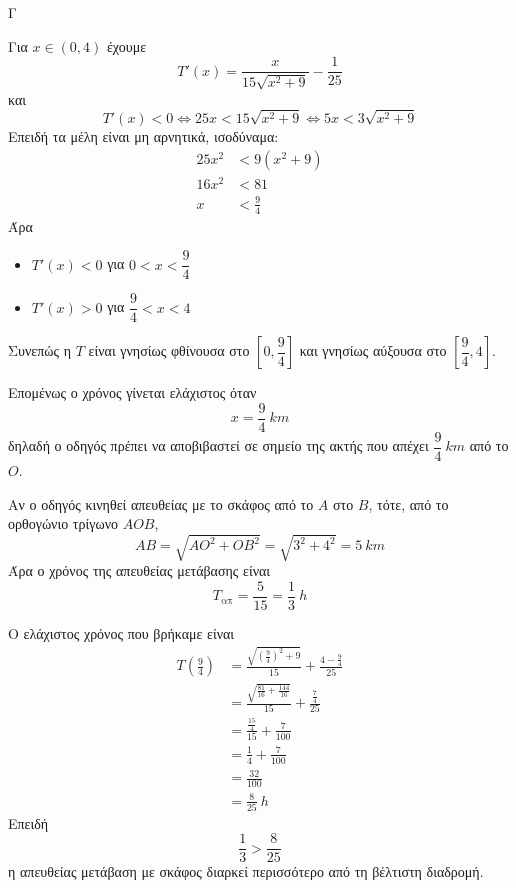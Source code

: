 \begin{thema}{Γ}
\begin{erwthma}
\item Για $x\in(0,4)$ έχουμε
\[T'(x)=\frac{x}{15\sqrt{x^2+9}}-\frac{1}{25}\]
και
\[T'(x)<0 \Leftrightarrow 25x<15\sqrt{x^2+9}\Leftrightarrow 5x<3\sqrt{x^2+9}\]
Επειδή τα μέλη είναι μη αρνητικά, ισοδύναμα:
\begin{align*}
25x^2&<9(x^2+9)\\
16x^2&<81\\
x&<\frac{9}{4}
\end{align*}
Άρα
\begin{itemize}
\item $T'(x)<0$ για $0<x<\dfrac{9}{4}$
\item $T'(x)>0$ για $\dfrac{9}{4}<x<4$
\end{itemize}
Συνεπώς η $T$ είναι γνησίως φθίνουσα στο $\left[0,\dfrac{9}{4}\right]$ και γνησίως αύξουσα στο $\left[\dfrac{9}{4},4\right]$.

Επομένως ο χρόνος γίνεται ελάχιστος όταν
\[x=\frac{9}{4}\ \si{km}\]
δηλαδή ο οδηγός πρέπει να αποβιβαστεί σε σημείο της ακτής που απέχει $\dfrac{9}{4}\ \si{km}$ από το $O$.

\item Αν ο οδηγός κινηθεί απευθείας με το σκάφος από το $A$ στο $B$, τότε, από το ορθογώνιο τρίγωνο $AOB$,
\[AB=\sqrt{AO^2+OB^2}=\sqrt{3^2+4^2}=5\ \si{km}\]
Άρα ο χρόνος της απευθείας μετάβασης είναι
\[T_{\text{απ}}=\frac{5}{15}=\frac{1}{3}\ \si{h}\]

Ο ελάχιστος χρόνος που βρήκαμε είναι
\begin{align*}
T\left(\frac{9}{4}\right)
&=\frac{\sqrt{\left(\frac{9}{4}\right)^2+9}}{15}+\frac{4-\frac{9}{4}}{25}\\
&=\frac{\sqrt{\frac{81}{16}+\frac{144}{16}}}{15}+\frac{\frac{7}{4}}{25}\\
&=\frac{\frac{15}{4}}{15}+\frac{7}{100}\\
&=\frac{1}{4}+\frac{7}{100}\\
&=\frac{32}{100}\\
&=\frac{8}{25}\ \si{h}
\end{align*}
Επειδή
\[\frac{1}{3}>\frac{8}{25}\]
η απευθείας μετάβαση με σκάφος διαρκεί περισσότερο από τη βέλτιστη διαδρομή.
\end{erwthma}
\end{thema}

